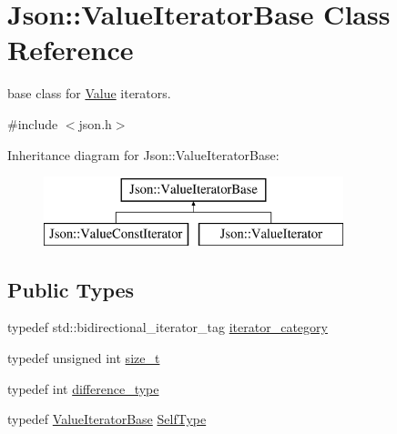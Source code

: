 \hypertarget{classJson_1_1ValueIteratorBase}{}\section{Json\+:\+:Value\+Iterator\+Base Class Reference}
\label{classJson_1_1ValueIteratorBase}


base class for \hyperlink{classJson_1_1Value}{Value} iterators.  




{\ttfamily \#include $<$json.\+h$>$}

Inheritance diagram for Json\+:\+:Value\+Iterator\+Base\+:\begin{figure}[H]
\begin{center}
\leavevmode
\includegraphics[height=2.000000cm]{classJson_1_1ValueIteratorBase}
\end{center}
\end{figure}
\subsection*{Public Types}
\begin{DoxyCompactItemize}
\item 
typedef std\+::bidirectional\+\_\+iterator\+\_\+tag \hyperlink{classJson_1_1ValueIteratorBase_a02fd11a4fbdc0007da1e8bcf5e6b83c3_a02fd11a4fbdc0007da1e8bcf5e6b83c3}{iterator\+\_\+category}
\item 
typedef unsigned int \hyperlink{classJson_1_1ValueIteratorBase_a9d3a3c7ce5cdefe23cb486239cf07bb5_a9d3a3c7ce5cdefe23cb486239cf07bb5}{size\+\_\+t}
\item 
typedef int \hyperlink{classJson_1_1ValueIteratorBase_a4e44bf8cbd17ec8d6e2c185904a15ebd_a4e44bf8cbd17ec8d6e2c185904a15ebd}{difference\+\_\+type}
\item 
typedef \hyperlink{classJson_1_1ValueIteratorBase}{Value\+Iterator\+Base} \hyperlink{classJson_1_1ValueIteratorBase_a9d2a940d03ea06d20d972f41a89149ee_a9d2a940d03ea06d20d972f41a89149ee}{Self\+Type}
\end{DoxyCompactItemize}
